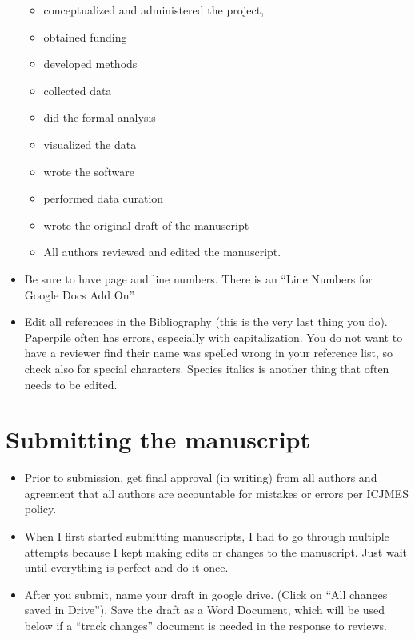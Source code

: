 \documentclass[
  letterpaper,
  DIV=11,
  numbers=noendperiod]{scrreprt}
\begin{document}
\begin{itemize}
  \begin{itemize}
  \item
    conceptualized and administered the project,
  \item
    obtained funding
  \item
    developed methods
  \item
    collected data
  \item
    did the formal analysis
  \item
    visualized the data
  \item
    wrote the software
  \item
    performed data curation
  \item
    wrote the original draft of the manuscript
  \item
    All authors reviewed and edited the manuscript.
  \end{itemize}
\item
  Be sure to have page and line numbers. There is an ``Line Numbers for
  Google Docs Add On''
\item
  Edit all references in the Bibliography (this is the very last thing
  you do). Paperpile often has errors, especially with capitalization.
  You do not want to have a reviewer find their name was spelled wrong
  in your reference list, so check also for special characters. Species
  italics is another thing that often needs to be edited.
\end{itemize}

\hypertarget{submitting-the-manuscript}{%
\section*{\texorpdfstring{\textbf{Submitting the
manuscript}}{Submitting the manuscript}}\label{submitting-the-manuscript}}


\begin{itemize}
\item
  Prior to submission, get final approval (in writing) from all authors
  and agreement that all authors are accountable for mistakes or errors
  per ICJMES policy.
\item
  When I first started submitting manuscripts, I had to go through
  multiple attempts because I kept making edits or changes to the
  manuscript. Just wait until everything is perfect and do it once.
\item
  After you submit, name your draft in google drive. (Click on ``All
  changes saved in Drive''). Save the draft as a Word Document, which
  will be used below if a ``track changes'' document is needed in the
  response to reviews.
\end{itemize}
\end{document}
